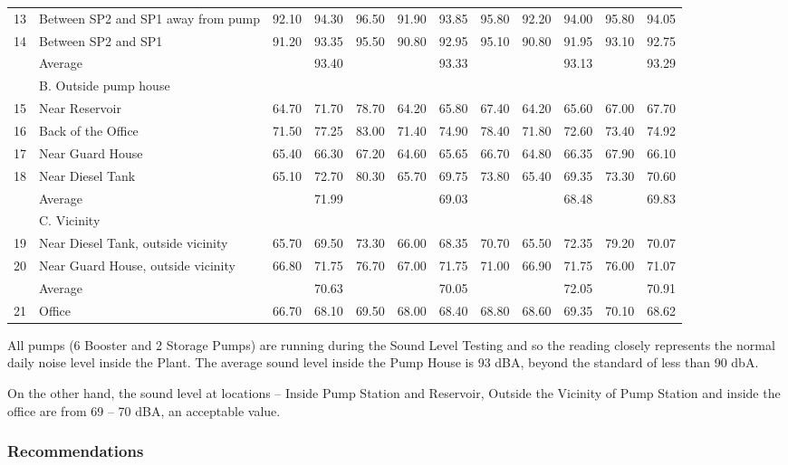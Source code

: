 \begin{table}[h]
{{\begin{tabular}{c|p{4cm}|ccc|ccc|ccc|c}
	13 & Between SP2 and SP1 away from pump & 92.10 & 94.30 & 96.50 & 91.90 & 93.85 & 95.80 & 92.20 & 94.00 & 95.80 & 94.05 \\ 
	14 & Between SP2 and SP1 & 91.20 & 93.35 & 95.50 & 90.80 & 92.95 & 95.10 & 90.80 & 91.95 & 93.10 & 92.75 \\ 
	& Average &  & 93.40 &  &  & 93.33 &  &  & 93.13 &  & 93.29 \\ 
	\hline
	& B. Outside pump house &  &  &  &  &  &  &  &  &  &  \\ 
	15 & Near Reservoir & 64.70 & 71.70 & 78.70 & 64.20 & 65.80 & 67.40 & 64.20 & 65.60 & 67.00 & 67.70 \\ 
	16 & Back of the Office & 71.50 & 77.25 & 83.00 & 71.40 & 74.90 & 78.40 & 71.80 & 72.60 & 73.40 & 74.92 \\ 
	17 & Near Guard House & 65.40 & 66.30 & 67.20 & 64.60 & 65.65 & 66.70 & 64.80 & 66.35 & 67.90 & 66.10 \\ 
	18 & Near Diesel Tank & 65.10 & 72.70 & 80.30 & 65.70 & 69.75 & 73.80 & 65.40 & 69.35 & 73.30 & 70.60 \\ 
	& Average &  & 71.99 &  &  & 69.03 &  &  & 68.48 &  & 69.83 \\ 
	\hline
	& C. Vicinity &  &  &  &  &  &  &  &  &  &  \\ 
	19 & Near Diesel Tank, outside vicinity & 65.70 & 69.50 & 73.30 & 66.00 & 68.35 & 70.70 & 65.50 & 72.35 & 79.20 & 70.07 \\ 
	20 & Near Guard House, outside vicinity & 66.80 & 71.75 & 76.70 & 67.00 & 71.75 & 71.00 & 66.90 & 71.75 & 76.00 & 71.07 \\ 
	& Average &  & 70.63 &  &  & 70.05 &  &  & 72.05 &  & 70.91 \\ 
	\hline
	21 & Office & 66.70 & 68.10 & 69.50 & 68.00 & 68.40 & 68.80 & 68.60 & 69.35 & 70.10 & 68.62 \\ 
	\hline
\end{tabular}
	}}
\end{table}


All pumps (6 Booster and 2 Storage Pumps) are running during the Sound Level Testing and so the reading closely represents the normal daily noise level inside the Plant. The average sound level inside the Pump House is 93 dBA, beyond the standard of less than 90 dbA. 

On the other hand, the sound level at locations – Inside Pump Station and Reservoir, Outside the Vicinity of Pump Station and inside the office are from 69 – 70 dBA, an acceptable value.

\subsubsection{Recommendations}

